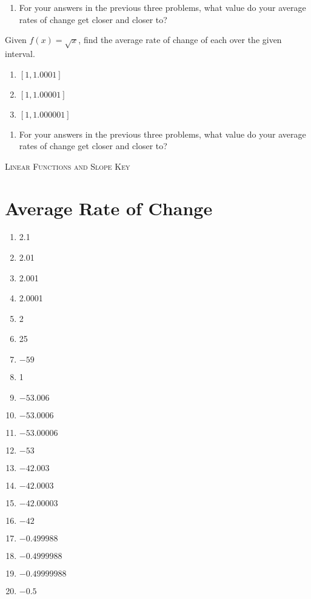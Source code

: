 \begin{enumerate}
\setcounter{enumi}{\value{Review}}
\item For your answers in the previous three problems, what value do your average rates of change get closer and closer to?
\setcounter{Review}{\value{enumi}}
\end{enumerate}

Given $f(x) = \sqrt{x}$, find the average rate of change of each over the given interval.
\begin{enumerate}
\setcounter{enumi}{\value{Review}}
	\item $[1, 1.0001]$
	\item $[1, 1.00001]$
	\item $[1, 1.000001]$
\setcounter{Review}{\value{enumi}}
\end{enumerate}

\begin{enumerate}
\setcounter{enumi}{\value{Review}}
\item For your answers in the previous three problems, what value do your average rates of change get closer and closer to?
\setcounter{Review}{\value{enumi}}
\end{enumerate}

\newpage

\textsc{Linear Functions and Slope Key}

\section*{Average Rate of Change}
\begin{enumerate}
\item 2.1
\item 2.01
\item 2.001
\item 2.0001
\item 2
\item 25
\item $-59$
\item 1
\item $-53.006$
\item $-53.0006$
\item $-53.00006$
\item $-53$
\item $-42.003$
\item $-42.0003$
\item $-42.00003$
\item $-42$
\item $-0.499988$
\item $-0.4999988$
\item $-0.49999988$
\item $-0.5$
\end{enumerate}